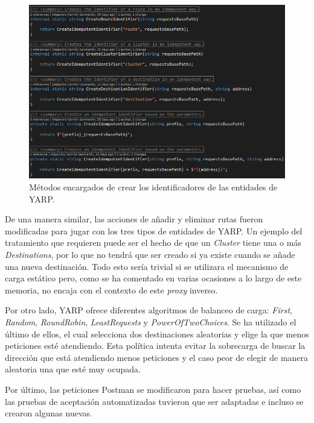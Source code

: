 \documentclass[11pt,spanish,listoffigures]{tfgetsinf}
\begin{document}
\begin{figure}[ht]
\centering
\includegraphics[width=1\textwidth]{imagenes/creacionIdentificadores}
\caption{Métodos encargados de crear los identificadores de las entidades de YARP.}
	\label{creacionIdentificadores}
\end{figure}

De una manera similar, las acciones de añadir y eliminar rutas fueron modificadas para jugar con los tres tipos de entidades de YARP. Un ejemplo del tratamiento que requieren puede ser el hecho de que un \emph{Cluster} tiene una o más \emph{Destinations}, por lo que no tendrá que ser creado si ya existe cuando se añade una nueva destinación. Todo esto sería trivial si se utilizara el mecanismo de carga estático pero, como se ha comentado en varias ocasiones a lo largo de este memoria, no encaja con el contexto de este \emph{proxy} inverso.

Por otro lado, YARP ofrece diferentes algoritmos de balanceo de carga: \emph{First}, \emph{Random}, \emph{RoundRobin}, \emph{LeastRequests} y \emph{PowerOfTwoChoices}. Se ha utilizado el último de ellos, el cual selecciona dos destinaciones aleatorias y elige la que menos peticiones esté atendiendo. Esta política intenta evitar la sobrecarga de buscar la dirección que está atendiendo menos peticiones y el caso peor de elegir de manera aleatoria una que esté muy ocupada.

Por último, las peticiones Postman se modificaron para hacer pruebas, así como las pruebas de aceptación automatizadas tuvieron que ser adaptadas e incluso se crearon algunas nuevas.

\end{document}
